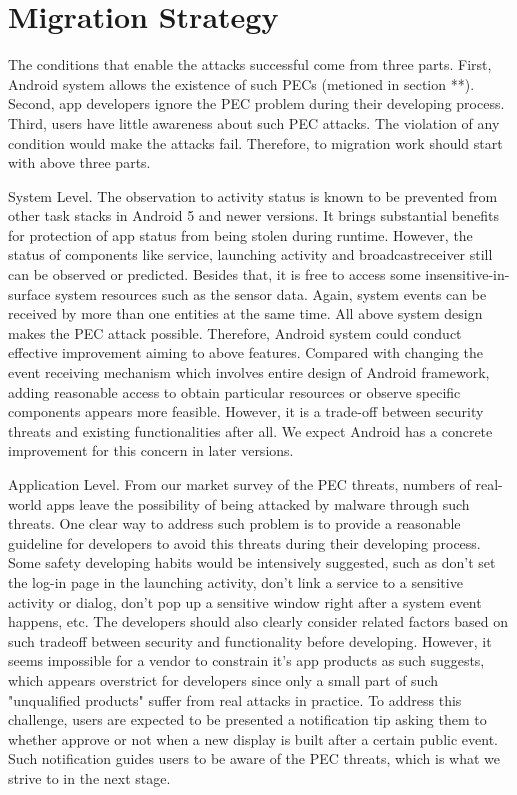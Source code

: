 \documentclass{sig-alternate-05-2015}
\begin{document}
\section{Migration Strategy}
The conditions that enable the attacks successful come from three parts. First, Android system allows the existence of such PECs (metioned in section **). Second, app developers ignore the PEC problem during their developing process. Third, users have little awareness about such PEC attacks. The violation of any condition would make the attacks fail. Therefore, to migration work should start with above three parts.
 
System Level. The observation to activity status is known to be prevented from other task stacks in Android 5 and newer versions. It brings substantial benefits for protection of app status from being stolen during runtime. However, the status of components like service, launching activity and broadcastreceiver still can be observed or predicted. Besides that, it is free to access some insensitive-in-surface system resources such as the sensor data. Again, system events can be received by more than one entities at the same time. All above system design makes the PEC attack possible. Therefore,   Android system could conduct effective improvement aiming to above features. Compared with changing the event receiving mechanism which involves entire design of Android framework, adding reasonable access to obtain particular resources or observe specific components appears more feasible. However, it is a trade-off between security threats and existing functionalities after all. We expect Android has a concrete improvement for this concern in later versions.

Application Level. From our market survey of the PEC threats, numbers of real-world apps leave the possibility of being attacked by malware through such threats. One clear way to address such problem is to provide a reasonable guideline for developers to avoid this threats during their developing process. Some safety developing habits would be intensively suggested, such as don't set the log-in page in the launching activity, don't link a service to a sensitive activity or dialog, don't pop up a sensitive window right after a system event happens, etc. The developers should also clearly consider related factors based on such tradeoff between security and functionality before developing. However, it seems impossible for a vendor to constrain it's app products as such suggests, which appears overstrict for developers since only a small part of such "unqualified products" suffer from real attacks in practice. To address this challenge, users are expected to be presented a notification tip asking them to whether approve or not when a new display is built after a certain public event. Such notification guides users to be aware of the PEC threats, which is what we strive to in the next stage.
\end{document}
